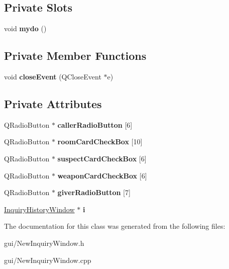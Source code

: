 \subsection*{Private Slots}
\begin{DoxyCompactItemize}
\item 
\mbox{\label{classNewInquiryWindow_ab4988cfb69c9f9a851359fc3490cd790}} 
void {\bfseries mydo} ()
\end{DoxyCompactItemize}
\subsection*{Private Member Functions}
\begin{DoxyCompactItemize}
\item 
\mbox{\label{classNewInquiryWindow_a9acb35a5231d8a493989c456c83c7640}} 
void {\bfseries close\+Event} (Q\+Close\+Event $\ast$e)
\end{DoxyCompactItemize}
\subsection*{Private Attributes}
\begin{DoxyCompactItemize}
\item 
\mbox{\label{classNewInquiryWindow_a319dfc303bf61850e2cddf3a3b81a25d}} 
Q\+Radio\+Button $\ast$ {\bfseries caller\+Radio\+Button} \mbox{[}6\mbox{]}
\item 
\mbox{\label{classNewInquiryWindow_a8232406fc1ba3183c0b4408aac004b50}} 
Q\+Radio\+Button $\ast$ {\bfseries room\+Card\+Check\+Box} \mbox{[}10\mbox{]}
\item 
\mbox{\label{classNewInquiryWindow_a3a7ea514cbe1d9bdf0bf53495cfdbf96}} 
Q\+Radio\+Button $\ast$ {\bfseries suspect\+Card\+Check\+Box} \mbox{[}6\mbox{]}
\item 
\mbox{\label{classNewInquiryWindow_acb6f1af5af3b523574bb8f1f055ad6ec}} 
Q\+Radio\+Button $\ast$ {\bfseries weapon\+Card\+Check\+Box} \mbox{[}6\mbox{]}
\item 
\mbox{\label{classNewInquiryWindow_a1aff2e998cbd0b11dde2f65c601e6e4d}} 
Q\+Radio\+Button $\ast$ {\bfseries giver\+Radio\+Button} \mbox{[}7\mbox{]}
\item 
\mbox{\label{classNewInquiryWindow_ac87190201e47b7c553007580e864b5cd}} 
\hyperlink{classInquiryHistoryWindow}{Inquiry\+History\+Window} $\ast$ {\bfseries i}
\end{DoxyCompactItemize}


The documentation for this class was generated from the following files\+:\begin{DoxyCompactItemize}
\item 
gui/New\+Inquiry\+Window.\+h\item 
gui/New\+Inquiry\+Window.\+cpp\end{DoxyCompactItemize}
